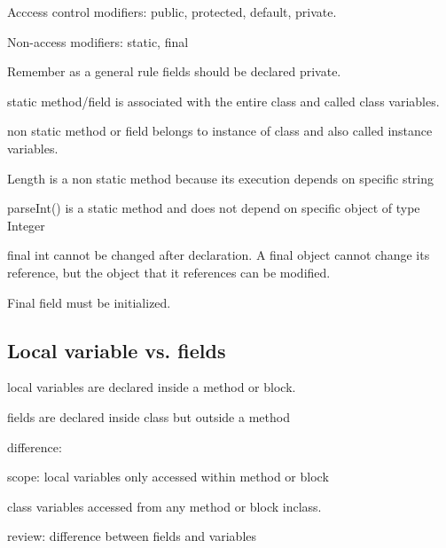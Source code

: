 \documentclass{article}
\begin{document}
Acccess control modifiers: public, protected, default, private.

Non-access modifiers: static, final

Remember as a general rule fields should be declared private.

static method/field is associated with the entire class and called class variables.

non static method or field belongs to instance of class and also called instance variables.

Length is a non static method because its execution depends on specific string

parseInt() is a static method and does not depend on specific object of type Integer

final int cannot be changed after declaration. A final object cannot change its reference, but the object that it references can be modified.

Final field must be initialized.

\subsection*{Local variable vs. fields}

local variables are declared inside a method or block.

fields are declared inside class but outside a method

difference: 

scope: local variables only accessed within method or block

class variables accessed from any method or block inclass.

review: difference between fields and variables
\end{document}
